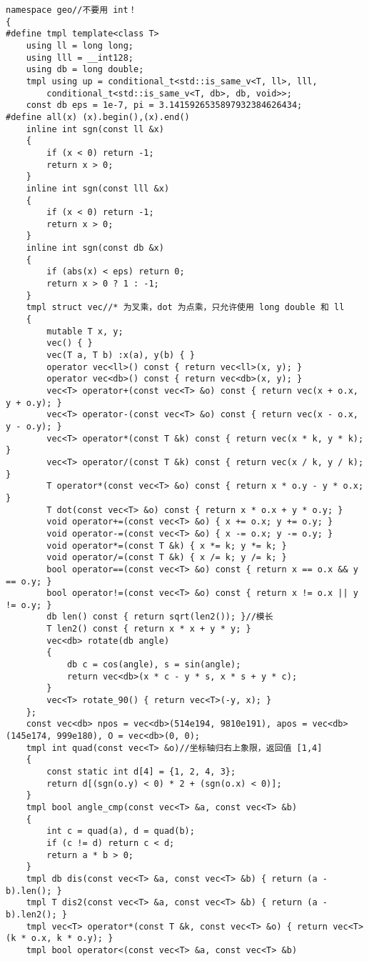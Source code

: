\documentclass[12pt]{ctexart}
\begin{document}
\begin{lstlisting}
namespace geo//不要用 int！
{
#define tmpl template<class T>
	using ll = long long;
	using lll = __int128;
	using db = long double;
	tmpl using up = conditional_t<std::is_same_v<T, ll>, lll,
		conditional_t<std::is_same_v<T, db>, db, void>>;
	const db eps = 1e-7, pi = 3.1415926535897932384626434;
#define all(x) (x).begin(),(x).end()
	inline int sgn(const ll &x)
	{
		if (x < 0) return -1;
		return x > 0;
	}
	inline int sgn(const lll &x)
	{
		if (x < 0) return -1;
		return x > 0;
	}
	inline int sgn(const db &x)
	{
		if (abs(x) < eps) return 0;
		return x > 0 ? 1 : -1;
	}
	tmpl struct vec//* 为叉乘，dot 为点乘，只允许使用 long double 和 ll
	{
		mutable T x, y;
		vec() { }
		vec(T a, T b) :x(a), y(b) { }
		operator vec<ll>() const { return vec<ll>(x, y); }
		operator vec<db>() const { return vec<db>(x, y); }
		vec<T> operator+(const vec<T> &o) const { return vec(x + o.x, y + o.y); }
		vec<T> operator-(const vec<T> &o) const { return vec(x - o.x, y - o.y); }
		vec<T> operator*(const T &k) const { return vec(x * k, y * k); }
		vec<T> operator/(const T &k) const { return vec(x / k, y / k); }
		T operator*(const vec<T> &o) const { return x * o.y - y * o.x; }
		T dot(const vec<T> &o) const { return x * o.x + y * o.y; }
		void operator+=(const vec<T> &o) { x += o.x; y += o.y; }
		void operator-=(const vec<T> &o) { x -= o.x; y -= o.y; }
		void operator*=(const T &k) { x *= k; y *= k; }
		void operator/=(const T &k) { x /= k; y /= k; }
		bool operator==(const vec<T> &o) const { return x == o.x && y == o.y; }
		bool operator!=(const vec<T> &o) const { return x != o.x || y != o.y; }
		db len() const { return sqrt(len2()); }//模长
		T len2() const { return x * x + y * y; }
		vec<db> rotate(db angle)
		{
			db c = cos(angle), s = sin(angle);
			return vec<db>(x * c - y * s, x * s + y * c);
		}
		vec<T> rotate_90() { return vec<T>(-y, x); }
	};
	const vec<db> npos = vec<db>(514e194, 9810e191), apos = vec<db>(145e174, 999e180), O = vec<db>(0, 0);
	tmpl int quad(const vec<T> &o)//坐标轴归右上象限，返回值 [1,4]
	{
		const static int d[4] = {1, 2, 4, 3};
		return d[(sgn(o.y) < 0) * 2 + (sgn(o.x) < 0)];
	}
	tmpl bool angle_cmp(const vec<T> &a, const vec<T> &b)
	{
		int c = quad(a), d = quad(b);
		if (c != d) return c < d;
		return a * b > 0;
	}
	tmpl db dis(const vec<T> &a, const vec<T> &b) { return (a - b).len(); }
	tmpl T dis2(const vec<T> &a, const vec<T> &b) { return (a - b).len2(); }
	tmpl vec<T> operator*(const T &k, const vec<T> &o) { return vec<T>(k * o.x, k * o.y); }
	tmpl bool operator<(const vec<T> &a, const vec<T> &b)

\end{lstlisting}
\end{document}
